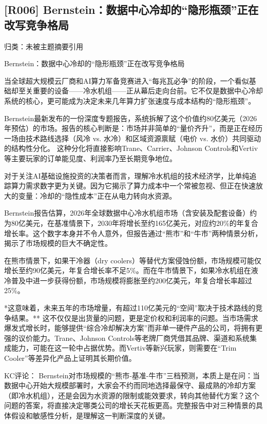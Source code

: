 \documentclass[11pt]{ctexart}
\begin{document}
\subsection{[R006] Bernstein：数据中心冷却的“隐形瓶颈”正在改写竞争格局}
{\small\color{refgray}归类：未被主题摘要引用}

Bernstein：数据中心冷却的“隐形瓶颈”正在改写竞争格局

当全球超大规模云厂商和AI算力军备竞赛进入“每兆瓦必争”的阶段，一个看似基础却至关重要的设备——冷水机组——正从幕后走向台前。它不仅是数据中心冷却系统的核心，更可能成为决定未来几年算力扩张速度与成本结构的“隐形瓶颈”。

Bernstein最新发布的一份深度专题报告，系统拆解了这个价值约80亿美元（2026年预估）的市场。报告的核心判断是：市场并非简单的“量价齐升”，而是正在经历一场由技术路线选择（风冷 vs. 水冷）和区域资源禀赋（电价 vs. 水价）共同驱动的结构性分化。 这种分化将直接影响Trane、Carrier、Johnson Controls和Vertiv等主要玩家的订单能见度、利润率乃至长期竞争地位。

对于关注AI基础设施投资的决策者而言，理解冷水机组的技术经济学，比单纯追踪算力需求数字更为关键。因为它揭示了算力成本中一个常被忽视、但正在快速放大的变量：冷却的“隐性成本”正在从电力转向水资源。

Bernstein报告估算，2026年全球数据中心冷水机组市场（含安装及配套设备）约为80亿美元，在基准情景下，2030年将增长至约165亿美元，对应约20\%的年复合增长率。这个数字本身并不令人意外，但报告通过“熊市”和“牛市”两种情景分析，揭示了市场规模的巨大不确定性。

在熊市情景下，如果干冷器（dry coolers）等替代方案侵蚀份额，市场规模可能仅增长至约90亿美元，年复合增长率不足5\%。而在牛市情景下，如果冷水机组在液冷普及中进一步获得份额，市场规模将膨胀至约200亿美元，年复合增长率超过25\%。

*这意味着，未来五年的市场增量，有超过110亿美元的“空间”取决于技术路线的竞争结果。** 这不仅仅是出货量的问题，更是定价权和利润率的问题。当市场需求爆发式增长时，能够提供“综合冷却解决方案”而非单一硬件产品的公司，将拥有更强的议价能力。Trane、Johnson Controls等老牌厂商凭借其品牌、渠道和系统集成能力，可能在这一轮中占据优势。而Vertiv等新兴玩家，则需要在“Trim Cooler”等差异化产品上证明其长期价值。

KC评论： Bernstein对市场规模的“熊市-基准-牛市”三档预测，本质上是在问：当数据中心开始大规模部署时，大家会不约而同地选择最保守、最成熟的冷却方案（即冷水机组），还是会因为水资源的限制或能效要求，转向其他替代方案？这个问题的答案，将直接决定哪类公司的增长天花板更高。完整报告中对三种情景的具体假设和敏感性分析，是理解这一判断深度的关键。
\end{document}
